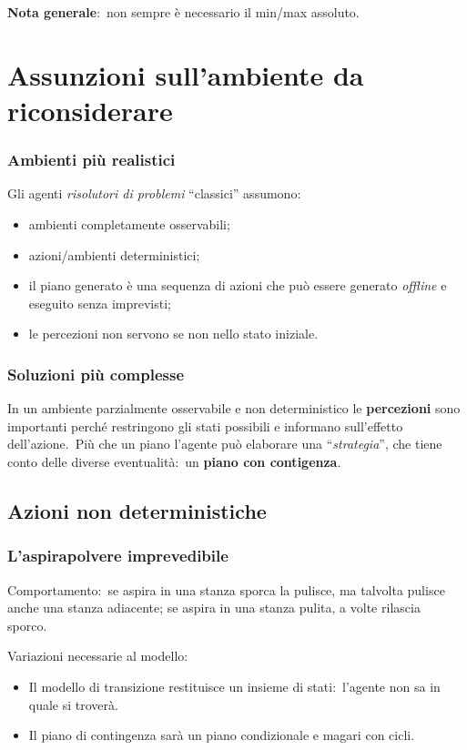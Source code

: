 \noindent \textbf{Nota generale}:\ non sempre è necessario il min/max assoluto.

\section{Assunzioni sull'ambiente da riconsiderare}

\subsubsection{Ambienti più realistici}
Gli agenti \textit{risolutori di problemi} ``classici'' assumono:
\begin{itemize}
	\item ambienti completamente osservabili;
	\item azioni/ambienti deterministici;
	\item il piano generato è una sequenza di azioni che può essere generato \textit{offline} e eseguito senza imprevisti;
	\item le percezioni non servono se non nello stato iniziale.
\end{itemize}

\subsubsection{Soluzioni più complesse}
In un ambiente parzialmente osservabile e non deterministico le \textbf{percezioni} sono importanti perché
restringono gli stati possibili e informano sull'effetto dell'azione.\
Più che un piano l'agente può elaborare una ``\textit{strategia}'', che tiene conto delle diverse eventualità:\ un \textbf{piano con contigenza}.

\subsection{Azioni non deterministiche}

\subsubsection{L'aspirapolvere imprevedibile}

Comportamento:\ se aspira in una stanza sporca la pulisce, ma talvolta pulisce anche una stanza adiacente; se aspira in una stanza pulita, a volte rilascia sporco.\

Variazioni necessarie al modello:
\begin{itemize}
	\item Il modello di transizione restituisce un insieme di stati:\ l'agente non sa in quale si troverà.
	\item Il piano di contingenza sarà un piano condizionale e magari con cicli.
\end{itemize}

